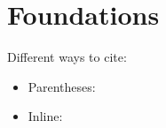 \chapter{Foundations}\label{sec:foundations}

Different ways to cite:
\begin{itemize}
    \item Parentheses: \autocite{Mikolov2013EfficientEstimationWord}
    \item Inline: \textcite{Mikolov2013EfficientEstimationWord}
\end{itemize}
